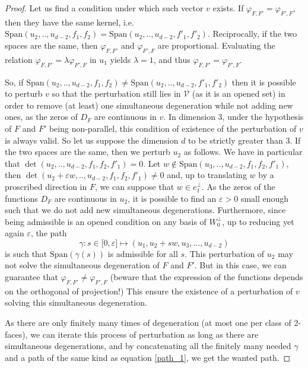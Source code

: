 \documentclass[12pt, notitlepage]{article}
\theoremstyle{plain}
\theoremstyle{definition}
\theoremstyle{plain}
\theoremstyle{remark}
\theoremstyle{plain}
\theoremstyle{plain}
\newcommand{\vect}{\text{Span}}
\begin{document}
\begin{proof}
     Let us find a condition under which such vector $v$ exists. If $\varphi_{F,F'}=\varphi_{F',F}$, then they have the same kernel, i.e. $\vect(u_2,..,u_{d-2},f_1,f_2) = \vect(u_2,..,u_{d-2},f'_1,f'_2)$. Reciprocally, if the two spaces are the same, then $\varphi_{F,F'}$ and $\varphi_{F',F}$ are proportional. Evaluating the relation $\varphi_{F,F'}= \lambda \varphi_{F',F}$ in $u_1$ yields $\lambda = 1$, and thus $\varphi_{F,F'}=\varphi_{F',F}$.
     

     So, if $\vect(u_2,..,u_{d-2},f_1,f_2) \neq \vect(u_2,..,u_{d-2},f'_1,f'_2)$ then it is possible to perturb $v$ so that the perturbation still lies in $\mathcal{V}$ (as it is an opened set) in order to remove (at least) one simultaneous degeneration while not adding new ones, as the zeros of $D_F$ are continuous in $v$. In dimension 3, under the hypothesis of $F$ and $F'$ being non-parallel, this condition of existence of the perturbation of $v$ is always valid. So let us suppose the dimension $d$ to be strictly greater than 3. If the two spaces are the same, then we perturb $u_2$ as follows. We have in particular that $\det(u_2,..,u_{d-2},f_1,f_2,f'_1) = 0$. Let $w\not \in \vect(u_3,..,u_{d-2},f_1,f_2,f'_1)$, then $\det(u_2+\varepsilon w,..,u_{d-2},f_1,f_2,f'_1) \neq 0$ and, up to translating $w$ by a proscribed direction in $F$, we can suppose that $w\in e_1^\perp$. As the zeros of the functions $D_F$ are continuous in $u_2$, it is possible to find an $\varepsilon>0$ small enough such that we do not add new simultaneous degenerations. Furthermore, since being admissible is an opened condition on any basis of $W_0^\perp$, up to reducing yet again $\varepsilon$, the path \[ \gamma : s\in \mathopen[0,\varepsilon\mathclose]\mapsto (u_1,u_2+sw,u_3,...,u_{d-2}) \] is such that $\vect(\gamma(s))$ is admissible for all $s$. This perturbation of $u_2$ may not solve the simultaneous degeneration of $F$ and $F'$. But in this case, we can guarantee that $\varphi_{F,F'} \neq \varphi_{F',F}$ (beware that the expression of the functions depends on the orthogonal of projection!) This ensure the existence of a perturbation of $v$ solving this simultaneous degeneration. 
     
     As there are only finitely many times of degeneration (at most one per class of 2-faces), we can iterate this process of perturbation as long as there are simultaneous degenerations, and by concatenating all the finitely many needed $\gamma$ and a path of the same kind as equation \eqref{path_1}, we get the wanted path.
\end{proof}
\end{document}
